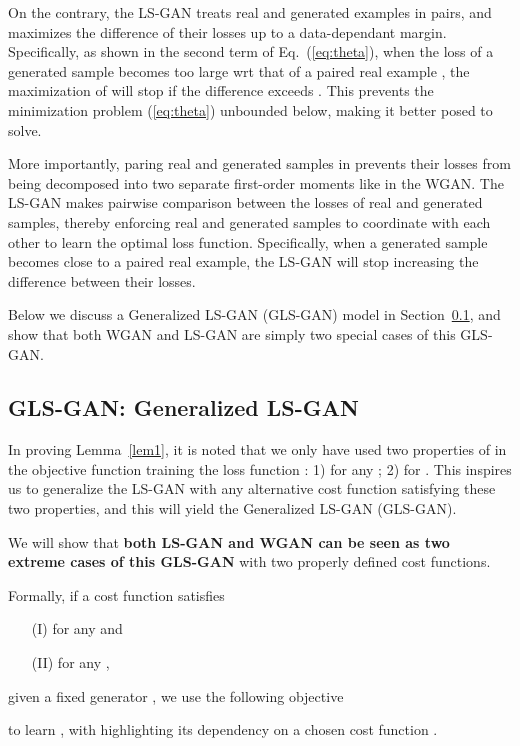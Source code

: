 \documentclass[11pt,fullpage, letterpaper,twoside]{article}
\newcommand{\1}[1]{\mathds{1}_{\left[#1\right]}}
\begin{document}
On the contrary, the LS-GAN treats real and generated examples in pairs, and maximizes the difference of their losses up to a data-dependant margin. Specifically, as shown in the second term of Eq.~(\ref{eq:theta}), when the loss of a generated sample  becomes too large wrt that of a paired real example , the maximization of  will stop if the difference  exceeds . This prevents the minimization problem (\ref{eq:theta}) unbounded below, making it better posed to solve.

More importantly, paring real and generated samples in  prevents their losses from being decomposed into two separate first-order moments like in the WGAN. The LS-GAN makes pairwise comparison between the losses of real and generated samples, thereby enforcing real and generated samples to coordinate with each other to learn the optimal loss function. Specifically, when a generated sample becomes close to a paired real example, the LS-GAN will stop increasing the difference  between their losses.



Below we discuss a Generalized LS-GAN (GLS-GAN) model in Section~\ref{sec:glsgan}, and show that both WGAN and LS-GAN are simply two special cases of this GLS-GAN.



\subsection{GLS-GAN: Generalized LS-GAN}\label{sec:glsgan}

In proving Lemma~\ref{lem1}, it is noted that we only have used two properties of  in the objective function  training the loss function : 1)  for any ; 2)  for . This inspires us to generalize the LS-GAN with any alternative cost function  satisfying these two properties, and this will yield the Generalized LS-GAN (GLS-GAN).

We will show that {\bf both LS-GAN and WGAN can be seen as two extreme cases of this GLS-GAN } with two properly defined cost functions.

Formally, if a cost function  satisfies
\begin{itemize}
\item[(I)]  for any  and
\item[(II)]  for any ,
\end{itemize}
given a fixed generator , we use the following objective

to learn , with  highlighting its dependency on a chosen cost function .
\end{document}
